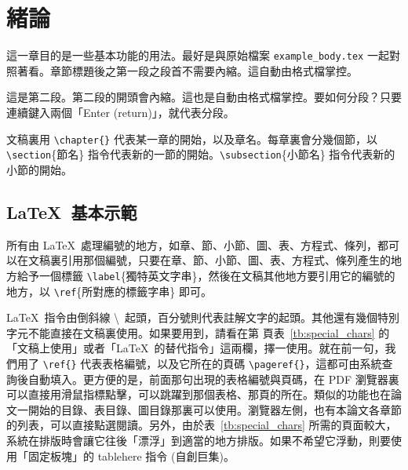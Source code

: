 %

\newsavebox{\fmbox}
\newenvironment{fmpage}[1]
{\begin{lrbox}{\fmbox}\begin{minipage}{#1}}
{\end{minipage}\end{lrbox}\fbox{\usebox{\fmbox}}}

\chapter{緒論}
\label{sec:intro}

這一章目的是一些基本功能的用法。最好是與原始檔案 \verb+example_body.tex+ 一起對照著看。章節標題後之第一段之段首不需要內縮。這自動由格式檔掌控。

這是第二段。第二段的開頭會內縮。這也是自動由格式檔掌控。要如何分段？只要連續鍵入兩個「Enter (return)」，就代表分段。

文稿裏用 \verb+\chapter{}+ 代表某一章的開始，以及章名。每章裏會分幾個節，以 \verb+\section+\{節名\} 指令代表新的一節的開始。\verb+\subsection+\{小節名\} 指令代表新的小節的開始。

\section{\mbox{\LaTeX\ 基本示範}}
\label{sec:latex_basic}

所有由 \LaTeX\ 處理編號的地方，如章、節、小節、圖、表、方程式、條列，都可以在文稿裏引用那個編號，只要在章、節、小節、圖、表、方程式、條列產生的地方給予一個標籤 \verb+\label+\{獨特英文字串\}，然後在文稿其他地方要引用它的編號的地方，以 \verb+\ref+\{所對應的標籤字串\} 即可。

\LaTeX\ 指令由倒斜線 \textbackslash\ 起頭，百分號則代表註解文字的起頭。其他還有幾個特別字元不能直接在文稿裏使用。如果要用到，請看在第 \pageref{tb:special_chars} 頁表~\ref{tb:special_chars} 的「文稿上使用」或者「\LaTeX\ 的替代指令」這兩欄，擇一使用。就在前一句，我們用了 \verb+\ref{}+ 代表表格編號，以及它所在的頁碼 \verb+\pageref{}+，這都可由系統查詢後自動填入。更方便的是，前面那句出現的表格編號與頁碼，在 PDF 瀏覽器裏可以直接用滑鼠指標點擊，可以跳躍到那個表格、那頁的所在。類似的功能也在論文一開始的目錄、表目錄、圖目錄那裏可以使用。瀏覽器左側，也有本論文各章節的列表，可以直接點選閱讀。另外，由於表~\ref{tb:special_chars} 所需的頁面較大，系統在排版時會讓它往後「漂浮」到適當的地方排版。如果不希望它浮動，則要使用「固定板塊」的 tablehere 指令 (自創巨集)。

